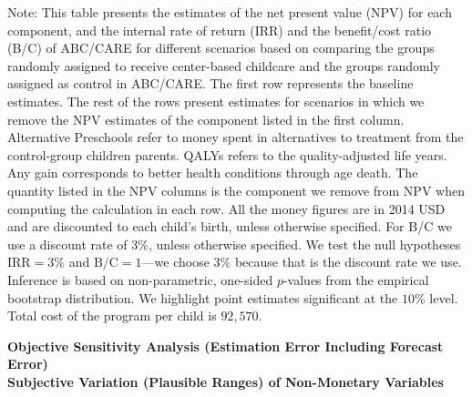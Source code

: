 \documentclass[static]{JJH-Beamer}
\begin{document}
\vspace{-8mm}
{\flushleft \small Note: This table presents the estimates of the net present value (NPV) for each component, and the internal rate of return (IRR) and the benefit/cost ratio (B/C) of ABC/CARE for different scenarios based on comparing the groups randomly assigned to receive center-based childcare and the groups randomly assigned as control in ABC/CARE. The first row represents the baseline estimates. The rest of the rows present estimates for scenarios in which we remove the NPV estimates of the component listed in the first column. Alternative Preschools refer to money spent in alternatives to treatment from the control-group children parents. QALYs refers to the quality-adjusted life years. Any gain corresponds to better health conditions through age death. The quantity listed in the NPV columns is the component we remove from NPV when computing the calculation in each row. All the money figures are in 2014 USD and are discounted to each child's birth, unless otherwise specified. For B/C we use a discount rate of $3\%$, unless otherwise specified. We test the null hypotheses $\text{IRR} = 3\%$ and $\text{B/C} = 1$---we choose $3\%$ because that is the discount rate we use. Inference is based on non-parametric, one-sided $p$-values from the empirical bootstrap distribution. We highlight point estimates significant at the $10\%$ level.\\
Total cost of the program per child is $92,570$.\\}

\clearpage

\begin{frame}

\begin{center}
\textbf{Objective Sensitivity Analysis (Estimation Error Including Forecast Error)\\ Subjective Variation (Plausible Ranges) of Non-Monetary Variables}
\end{center}

\end{frame}
\end{document}

